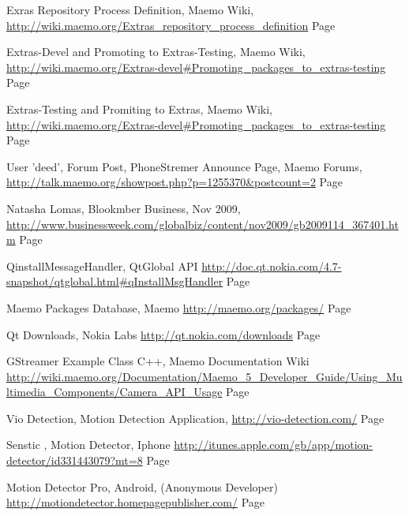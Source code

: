 \documentclass[11pt]{article} %
\begin{document}
\begin{thebibliography}{9}

Exras Repository Process Definition, Maemo Wiki,
\url{http://wiki.maemo.org/Extras_repository_process_definition}
Page~\pageref{ref:repproc}

Extras-Devel and Promoting to Extras-Testing, Maemo Wiki,
\url{http://wiki.maemo.org/Extras-devel#Promoting_packages_to_extras-testing}
Page~\pageref{ref:promtest}

Extras-Testing and Promiting to Extras, Maemo Wiki,
\url{http://wiki.maemo.org/Extras-devel#Promoting_packages_to_extras-testing}
Page~\pageref{ref:promext}

User 'deed', Forum Post, PhoneStremer Announce Page, Maemo Forums,
\url{http://talk.maemo.org/showpost.php?p=1255370&postcount=2}
Page~\pageref{ref:appraisal}


Natasha Lomas, Blookmber Business, Nov 2009,
\url{http://www.businessweek.com/globalbiz/content/nov2009/gb2009114_367401.htm}
Page~\pageref{ref:blook}

QinstallMessageHandler, QtGlobal API
\url{http://doc.qt.nokia.com/4.7-snapshot/qtglobal.html#qInstallMsgHandler}
Page~\pageref{ref:qinst}

Maemo Packages Database, Maemo
\url{http://maemo.org/packages/}
Page~\pageref{ref:packsearch}

Qt Downloads, Nokia Labs
\url{http://qt.nokia.com/downloads}
Page~\pageref{ref:qtdown}

GStreamer Example Class C++, Maemo Documentation Wiki
\url{http://wiki.maemo.org/Documentation/Maemo_5_Developer_Guide/Using_Multimedia_Components/Camera_API_Usage}
Page~\pageref{ref:camex}

Vio Detection, Motion Detection Application,
\url{http://vio-detection.com/}
Page~\pageref{ref:vio}

Senstic , Motion Detector, Iphone
\url{http://itunes.apple.com/gb/app/motion-detector/id331443079?mt=8}
Page~\pageref{ref:moip}

Motion Detector Pro, Android, (Anonymous Developer)
\url{http://motiondetector.homepagepublisher.com/}
Page~\pageref{ref:moan}

\end{thebibliography}
\end{document}
